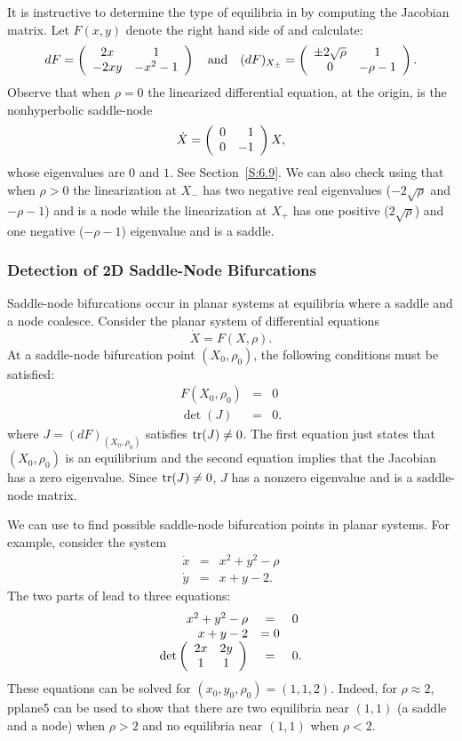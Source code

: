 \documentclass{ximera}
\begin{document}
It is instructive to determine the type of equilibria in  by
computing the Jacobian matrix.  Let $F(x,y)$ denote the right hand side of 
 and calculate:
\begin{equation}  \label{E:SNJ}
dF = \left(\begin{array}{cc} 2x & 1\\ -2xy &-x^2-1\end{array}\right) \quad\mbox{and}\quad 
(dF)_{X_{\pm}}= \left(\begin{array}{cc} \pm 2\sqrt{\rho} & 1\\ 0 &-\rho-1\end{array}\right).
\end{equation}
Observe that when $\rho=0$ the linearized differential equation, at the origin, 
is the nonhyperbolic saddle-node
\[
\dot{X} = \left(\begin{array}{rr} 0 & 1\\ 0 &-1\end{array}\right)X,
\]
whose eigenvalues are $0$ and $1$.  See Section~\ref{S:6.9}. We can also check
using  that when $\rho>0$ the linearization at $X_{-}$ has two 
negative real eigenvalues ($-2\sqrt{\rho}$ and $-\rho-1$)  and is a node 
while the linearization at $X_{+}$ has one positive ($2\sqrt{\rho}$) and one 
negative ($-\rho-1$) eigenvalue and is a saddle.


\subsubsection*{Detection of 2D Saddle-Node Bifurcations}

Saddle-node bifurcations occur in planar systems at equilibria  where a 
saddle and a node coalesce.  Consider the planar system of differential 
equations
\[
\dot{X} = F(X,\rho).
\]
At a saddle-node bifurcation point $(X_0,\rho_0)$, the following conditions
must be satisfied:
\begin{equation}  \label{E:DCSN2}
\begin{array}{rcl}
F(X_0,\rho_0) & = & 0\\
\det(J) & = & 0.
\end{array}
\end{equation}
where $J = (dF)_{(X_0,\rho_0)}$ satisfies ${\rm tr}(J)\neq 0$.  The first 
equation just states that $(X_0,\rho_0)$ is an equilibrium and the second 
equation implies that the Jacobian has a zero eigenvalue.  Since 
${\rm tr}(J)\neq 0$, $J$ has a nonzero eigenvalue and is a saddle-node matrix.

We can use  to find possible saddle-node bifurcation points in
planar systems.  For example, consider the system
\[
\begin{array}{rcl} 
\dot{x} & = & x^2 + y^2 - \rho\\
\dot{y} & = & x + y -2.
\end{array}
\]
The two parts of  lead to three equations:
\[
\begin{array}{rcl} 
x^2 + y^2 - \rho & = & 0\\
x + y -2 & = 0\\
\det\left(\begin{array}{cc} 2x & 2y\\ 1 &1\end{array}\right) & = & 0.
\end{array}
\]
These equations can be solved for $(x_0,y_0,\rho_0)=(1,1,2)$.  Indeed, for 
$\rho\approx 2$, {\sf pplane5} can be used to show that there are two 
equilibria near $(1,1)$ (a saddle and a node) when $\rho>2$ and no 
equilibria near $(1,1)$ when $\rho<2$.
\end{document}
